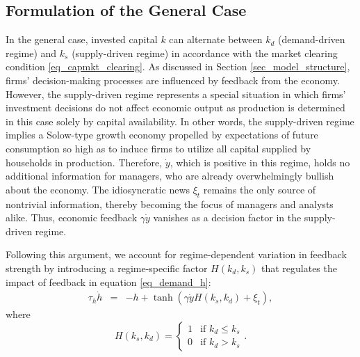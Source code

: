 \documentclass[authoryear, review]{elsarticle}
\begin{document}
\subsection{Formulation of the General Case}\label{sec_results_formulation}
In the general case, invested capital $k$ can alternate between $k_d$ (demand-driven regime) and $k_s$ (supply-driven regime) in accordance with the market clearing condition \eqref{eq_capmkt_clearing}. As discussed in Section \ref{sec_model_structure}, firms' decision-making processes are influenced by feedback from the economy. However, the supply-driven regime represents a special situation in which firms' investment decisions do not affect economic output as production is determined in this case solely by capital availability. In other words, the supply-driven regime implies a Solow-type growth economy propelled by expectations of future consumption so high as to induce firms to utilize all capital supplied by households in production. Therefore, $\dot{y}$, which is positive in this regime, holds no additional information for managers, who are already overwhelmingly bullish about the economy. The idiosyncratic news $\xi_t$ remains the only source of nontrivial information, thereby becoming the focus of managers and analysts alike. Thus, economic feedback $\gamma\dot{y}$ vanishes as a decision factor in the supply-driven regime.

Following this argument, we account for regime-dependent variation in feedback strength by introducing a regime-specific factor $H(k_d, k_s)$ that regulates the impact of feedback in equation \eqref{eq_demand_h}:
\begin{eqnarray}
	\tau_h \dot{h} &=& -h + \tanh\left(\gamma\dot{y}H(k_s,k_d) +\xi_t\right)\label{eq_h_dot},
\end{eqnarray}
where
\begin{equation}\label{eq_H_switch}
	H(k_s,k_d) = 
	\begin{cases}
		1 &\text{if }k_d\leq k_s\\
		0 &\text{if }k_d>k_s
	\end{cases} .
\end{equation}
\end{document}
